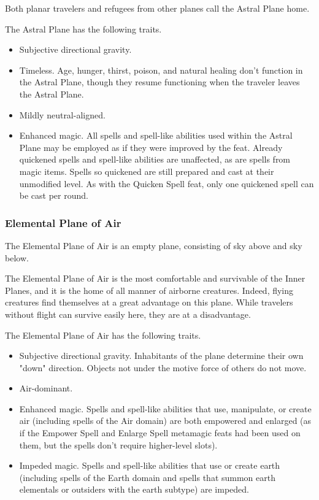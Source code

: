 Both planar travelers and refugees from other planes call the Astral Plane home. 

The Astral Plane has the following traits.

\begin{itemize}
\item Subjective directional gravity.
\item Timeless. Age, hunger, thirst, poison, and natural healing don't function in the 
Astral Plane, though they resume functioning when the traveler leaves the Astral 
Plane.
\item Mildly neutral-aligned.
\item Enhanced magic. All spells and spell-like abilities used within the Astral Plane 
may be employed as if they were improved by the  feat. Already quickened 
spells and spell-like abilities are unaffected, as are spells from magic items. 
Spells so quickened are still prepared and cast at their unmodified level. As with 
the Quicken Spell feat, only one quickened spell can be cast per round.
\end{itemize}

\subsubsection{Elemental Plane of Air}

The Elemental Plane of Air is an empty plane, consisting of sky above and sky below.

The Elemental Plane of Air is the most comfortable and survivable of the Inner 
Planes, and it is the home of all manner of airborne creatures. Indeed, flying 
creatures find themselves at a great advantage on this plane. While travelers without 
flight can survive easily here, they are at a disadvantage.

The Elemental Plane of Air has the following traits.

\begin{itemize}
\item Subjective directional gravity. Inhabitants of the plane determine their own "down" 
direction. Objects not under the motive force of others do not move.
\item Air-dominant.
\item Enhanced magic. Spells and spell-like abilities that use, manipulate, or create 
air (including spells of the Air domain) are both empowered and enlarged (as if 
the Empower Spell and Enlarge Spell metamagic feats had been used on them, but 
the spells don't require higher-level slots).
\item Impeded magic. Spells and spell-like abilities that use or create earth (including 
spells of the Earth domain and spells that summon earth elementals or outsiders 
with the earth subtype) are impeded.
\end{itemize}


